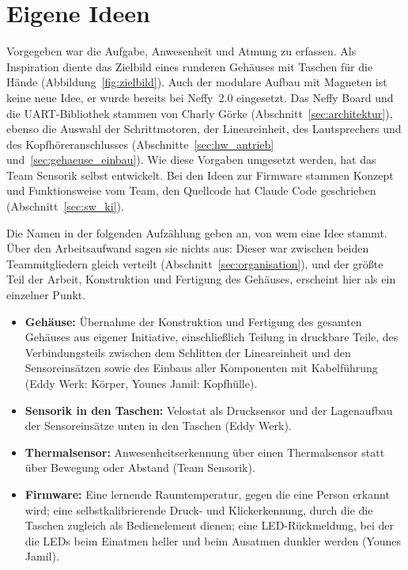 \section{Eigene Ideen}
\label{sec:eigene_ideen}

Vorgegeben war die Aufgabe, Anwesenheit und Atmung zu erfassen. Als Inspiration diente das
Zielbild eines runderen Gehäuses mit Taschen für die Hände (Abbildung~\ref{fig:zielbild}). Auch der
modulare Aufbau mit Magneten ist keine neue Idee, er wurde bereits bei Neffy~2.0
eingesetzt. Das Neffy Board und die \ac{UART}-Bibliothek stammen von
Charly Görke (Abschnitt~\ref{sec:architektur}), ebenso die Auswahl der Schrittmotoren, der
Lineareinheit, des Lautsprechers und des Kopfhöreranschlusses (Abschnitte~\ref{sec:hw_antrieb}
und~\ref{sec:gehaeuse_einbau}). Wie diese Vorgaben umgesetzt werden, hat das
Team Sensorik selbst entwickelt. Bei den Ideen zur Firmware stammen Konzept und Funktionsweise
vom Team, den Quellcode hat Claude Code geschrieben (Abschnitt~\ref{sec:sw_ki}).

Die Namen in der folgenden Aufzählung geben an, von wem eine Idee stammt. Über den Arbeitsaufwand
sagen sie nichts aus: Dieser war zwischen beiden Teammitgliedern gleich verteilt
(Abschnitt~\ref{sec:organisation}), und der größte Teil der Arbeit, Konstruktion und Fertigung
des Gehäuses, erscheint hier als ein einzelner Punkt.

\begin{itemize}
  \item \textbf{Gehäuse:} Übernahme der Konstruktion und Fertigung des gesamten Gehäuses aus
        eigener Initiative, einschließlich Teilung in druckbare Teile, des Verbindungsteils
        zwischen dem Schlitten der Lineareinheit und den Sensoreinsätzen sowie des Einbaus aller
        Komponenten mit Kabelführung (Eddy Werk: Körper, Younes Jamil: Kopfhülle).
  \item \textbf{Sensorik in den Taschen:} Velostat als Drucksensor und der Lagenaufbau der
        Sensoreinsätze unten in den Taschen (Eddy Werk).
  \item \textbf{Thermalsensor:} Anwesenheitserkennung über einen Thermalsensor statt über
        Bewegung oder Abstand (Team Sensorik).
  \item \textbf{Firmware:} Eine lernende Raumtemperatur, gegen die eine Person erkannt wird; eine
        selbstkalibrierende Druck- und Klickerkennung, durch die die Taschen zugleich als
        Bedienelement dienen; eine \ac{LED}-Rückmeldung, bei der die \acp{LED} beim Einatmen heller
        und beim Ausatmen dunkler werden (Younes Jamil).
\end{itemize}
